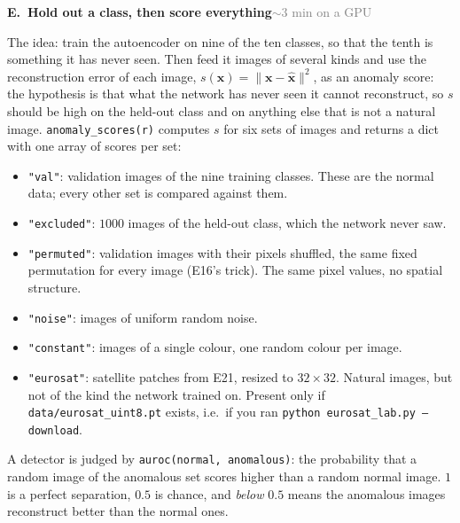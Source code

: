 \documentclass[11pt]{article}
\newcommand{\code}[1]{\texttt{#1}}
\newcounter{exp}
\newenvironment{experiment}[2]{\refstepcounter{exp}\par\medskip
  \textbf{\textcolor{aiblue}{E\theexp.\ #1}}\hfill{\small\textcolor{gray}{#2}}\par}{\par}
\begin{document}
\begin{experiment}{Hold out a class, then score everything}{$\sim$3 min on a GPU}
The idea: train the autoencoder on nine of the ten classes, so that the tenth is something it has never seen. Then feed it images of several kinds and use the reconstruction error of each image, $s(\mathbf x)=\|\mathbf x-\hat{\mathbf x}\|^2$, as an anomaly score: the hypothesis is that what the network has never seen it cannot reconstruct, so $s$ should be high on the held-out class and on anything else that is not a natural image. \code{anomaly\_scores(r)} computes $s$ for six sets of images and returns a dict with one array of scores per set:
\begin{itemize}
  \item \code{"val"}: validation images of the nine training classes. These are the normal data; every other set is compared against them.
  \item \code{"excluded"}: $1000$ images of the held-out class, which the network never saw.
  \item \code{"permuted"}: validation images with their pixels shuffled, the same fixed permutation for every image (E16's trick). The same pixel values, no spatial structure.
  \item \code{"noise"}: images of uniform random noise.
  \item \code{"constant"}: images of a single colour, one random colour per image.
  \item \code{"eurosat"}: satellite patches from E21, resized to $32\times32$. Natural images, but not of the kind the network trained on. Present only if \code{data/eurosat\_uint8.pt} exists, i.e.\ if you ran \code{python eurosat\_lab.py --download}.
\end{itemize}
A detector is judged by \code{auroc(normal, anomalous)}: the probability that a random image of the anomalous set scores higher than a random normal image. $1$ is a perfect separation, $0.5$ is chance, and \emph{below} $0.5$ means the anomalous images reconstruct better than the normal ones.


\end{experiment}
\end{document}
